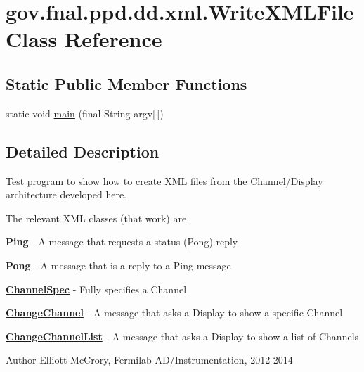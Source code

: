 \hypertarget{classgov_1_1fnal_1_1ppd_1_1dd_1_1xml_1_1WriteXMLFile}{\section{gov.\-fnal.\-ppd.\-dd.\-xml.\-Write\-X\-M\-L\-File Class Reference}
\label{classgov_1_1fnal_1_1ppd_1_1dd_1_1xml_1_1WriteXMLFile}
}
\subsection*{Static Public Member Functions}
\begin{DoxyCompactItemize}
\item 
static void \hyperlink{classgov_1_1fnal_1_1ppd_1_1dd_1_1xml_1_1WriteXMLFile_a5cc794a07a8e62fec4291fac882ec9ca}{main} (final String argv\mbox{[}$\,$\mbox{]})
\end{DoxyCompactItemize}


\subsection{Detailed Description}
Test program to show how to create X\-M\-L files from the Channel/\-Display architecture developed here. 

The relevant X\-M\-L classes (that work) are 
\begin{DoxyItemize}
\item {\bfseries Ping} -\/ A message that requests a status (Pong) reply 
\item {\bfseries Pong} -\/ A message that is a reply to a Ping message 
\item {\bfseries \hyperlink{classgov_1_1fnal_1_1ppd_1_1dd_1_1xml_1_1ChannelSpec}{Channel\-Spec}} -\/ Fully specifies a Channel 
\item {\bfseries \hyperlink{classgov_1_1fnal_1_1ppd_1_1dd_1_1xml_1_1ChangeChannel}{Change\-Channel}} -\/ A message that asks a Display to show a specific Channel 
\item {\bfseries \hyperlink{classgov_1_1fnal_1_1ppd_1_1dd_1_1xml_1_1ChangeChannelList}{Change\-Channel\-List}} -\/ A message that asks a Display to show a list of Channels 
\end{DoxyItemize}

\begin{DoxyAuthor}{Author}
Elliott Mc\-Crory, Fermilab A\-D/\-Instrumentation, 2012-\/2014 
\end{DoxyAuthor}



